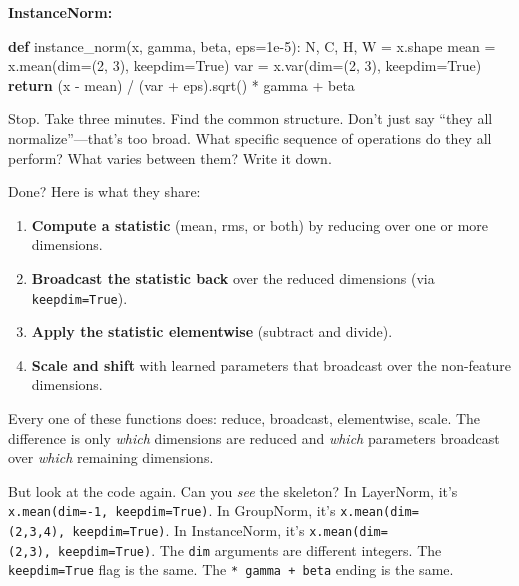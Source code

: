 \documentclass[11pt,titlepage]{article}
\newenvironment{Shaded}{}{}
\newcommand{\ControlFlowTok}[1]{\textcolor[rgb]{0.00,0.44,0.13}{\textbf{#1}}}
\newcommand{\DecValTok}[1]{\textcolor[rgb]{0.25,0.63,0.44}{#1}}
\newcommand{\FloatTok}[1]{\textcolor[rgb]{0.25,0.63,0.44}{#1}}
\newcommand{\KeywordTok}[1]{\textcolor[rgb]{0.00,0.44,0.13}{\textbf{#1}}}
\newcommand{\NormalTok}[1]{#1}
\newcommand{\OperatorTok}[1]{\textcolor[rgb]{0.40,0.40,0.40}{#1}}
\newcommand{\VariableTok}[1]{\textcolor[rgb]{0.10,0.09,0.49}{#1}}
\providecommand{\tightlist}{%
  \setlength{\itemsep}{0pt}\setlength{\parskip}{0pt}}
\begin{document}
\textbf{InstanceNorm:}

\begin{Shaded}
\begin{Highlighting}[]
\KeywordTok{def}\NormalTok{ instance_norm(x, gamma, beta, eps}\OperatorTok{=}\FloatTok{1e-5}\NormalTok{):}
\NormalTok{    N, C, H, W }\OperatorTok{=}\NormalTok{ x.shape}
\NormalTok{    mean }\OperatorTok{=}\NormalTok{ x.mean(dim}\OperatorTok{=}\NormalTok{(}\DecValTok{2}\NormalTok{, }\DecValTok{3}\NormalTok{), keepdim}\OperatorTok{=}\VariableTok{True}\NormalTok{)}
\NormalTok{    var }\OperatorTok{=}\NormalTok{ x.var(dim}\OperatorTok{=}\NormalTok{(}\DecValTok{2}\NormalTok{, }\DecValTok{3}\NormalTok{), keepdim}\OperatorTok{=}\VariableTok{True}\NormalTok{)}
    \ControlFlowTok{return}\NormalTok{ (x }\OperatorTok{-}\NormalTok{ mean) }\OperatorTok{/}\NormalTok{ (var }\OperatorTok{+}\NormalTok{ eps).sqrt() }\OperatorTok{*}\NormalTok{ gamma }\OperatorTok{+}\NormalTok{ beta}
\end{Highlighting}
\end{Shaded}

Stop. Take three minutes. Find the common structure. Don't just say
``they all normalize''---that's too broad. What specific sequence of
operations do they all perform? What varies between them? Write it down.

\vspace{2em}

Done? Here is what they share:

\begin{enumerate}
\def\labelenumi{\arabic{enumi}.}
\tightlist
\item
  \textbf{Compute a statistic} (mean, rms, or both) by reducing over one
  or more dimensions.
\item
  \textbf{Broadcast the statistic back} over the reduced dimensions (via
  \texttt{keepdim=True}).
\item
  \textbf{Apply the statistic elementwise} (subtract and divide).
\item
  \textbf{Scale and shift} with learned parameters that broadcast over
  the non-feature dimensions.
\end{enumerate}

Every one of these functions does: reduce, broadcast, elementwise,
scale. The difference is only \emph{which} dimensions are reduced and
\emph{which} parameters broadcast over \emph{which} remaining
dimensions.

But look at the code again. Can you \emph{see} the skeleton? In
LayerNorm, it's \texttt{x.mean(dim=-1,\ keepdim=True)}. In GroupNorm,
it's \texttt{x.mean(dim=(2,3,4),\ keepdim=True)}. In InstanceNorm, it's
\texttt{x.mean(dim=(2,3),\ keepdim=True)}. The \texttt{dim} arguments
are different integers. The \texttt{keepdim=True} flag is the same. The
\texttt{*\ gamma\ +\ beta} ending is the same.
\end{document}
